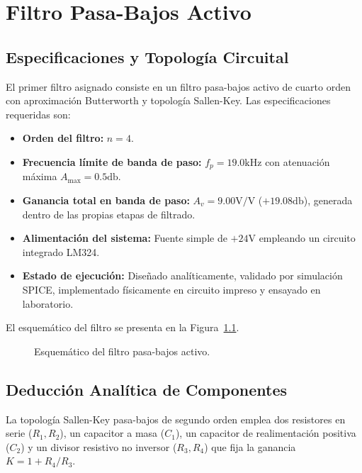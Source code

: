 \chapter{Filtro Pasa-Bajos Activo}

\section{Especificaciones y Topología Circuital}
El primer filtro asignado consiste en un filtro pasa-bajos activo de cuarto orden con aproximación Butterworth y
topología Sallen-Key. Las especificaciones requeridas son:

\begin{itemize}
    \item \textbf{Orden del filtro:} $n = 4$.
    \item \textbf{Frecuencia límite de banda de paso:} $f_p = 19.0 \unit{\kilo\hertz}$ con atenuación máxima $A_{\max} = 0.5 \unit{\decibel}$.
    \item \textbf{Ganancia total en banda de paso:} $A_v = 9.00 \unit{\volt\per\volt}$ ($+19.08 \unit{\decibel}$), generada dentro de las propias etapas de filtrado.
    \item \textbf{Alimentación del sistema:} Fuente simple de $+24 \unit{\volt}$ empleando un circuito integrado LM324.
    \item \textbf{Estado de ejecución:} Diseñado analíticamente, validado por simulación SPICE, implementado físicamente en circuito impreso y ensayado en laboratorio.
\end{itemize}
El esquemático del filtro se presenta en la Figura~\ref{fig.ej2:sch}.
\begin{figure}[!ht]
    \centering
    
    \caption{Esquemático del filtro pasa-bajos activo.}
    \label{fig.ej2:sch}
\end{figure}

\section{Deducción Analítica de Componentes}
La topología Sallen-Key pasa-bajos de segundo orden emplea dos resistores en serie ($R_1, R_2$), un capacitor a masa
($C_1$), un capacitor de realimentación positiva ($C_2$) y un divisor resistivo no inversor ($R_3, R_4$) que fija la
ganancia $K = 1 + R_4/R_3$.

